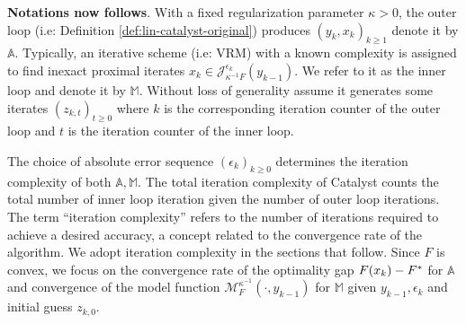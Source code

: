 \documentclass[12pt]{article}
\begin{document}
        \textbf{Notations now follows}. 
        With a fixed regularization parameter $\kappa > 0$, the outer loop (i.e: Definition \ref{def:lin-catalyst-original}) produces $(y_{k}, x_k)_{k \ge 1}$ denote it by $\mathbb A$. 
        Typically, an iterative scheme (i.e: VRM) with a known complexity is assigned to find inexact proximal iterates $x_k \in {\mathcal J}_{\kappa^{-1}F}^{\epsilon_k} (y_{k - 1})$. 
        We refer to it as the inner loop and denote it by $\mathbb M$. 
        Without loss of generality assume it generates some iterates $(z_{k, t})_{t \ge 0}$ where $k$ is the corresponding iteration counter of the outer loop and $t$ is the iteration counter of the inner loop. 
        \par 
        The choice of absolute error sequence $(\epsilon_k)_{k \ge 0}$ determines the iteration complexity of both $\mathbb A, \mathbb M$. 
        The total iteration complexity of Catalyst counts the total number of inner loop iteration given  the number of outer loop iterations. 
        The term ``iteration complexity'' refers to the number of iterations required to achieve a desired accuracy, a concept related to the convergence rate of the algorithm. 
        We adopt iteration complexity in the sections that follow. 
        Since $F$ is convex, we focus on the convergence rate of the optimality gap $F(x_k) - F^*\*$ for $\mathbb A$ and convergence of the model function $\mathcal M_F^{\kappa^{-1}}(\cdot, y_{k - 1})$ for $\mathbb M$ given $y_{k - 1}, \epsilon_k$ and initial guess $z_{k, 0}$. 
        \par
\end{document}
